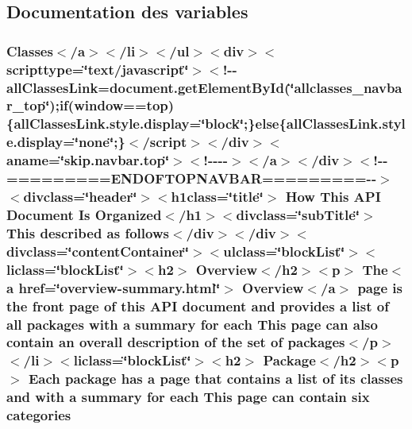 \subsection{Documentation des variables}
\hypertarget{help-doc_8html_a11477b189247b7b79e09770d044c6b82}{
\subsubsection[{categories}]{\setlength{\rightskip}{0pt plus 5cm}Classes$<$/{\bf a}$>$$<$/li$>$$<$/ul$>$$<$div$>$$<$scripttype=\char`\"{}text/javascript\char`\"{}$>$$<$!-\/-\/all\-Classes\-Link=document.\-get\-Element\-By\-Id(\char`\"{}allclasses\-\_\-navbar\-\_\-top\char`\"{});if(window==top)\{all\-Classes\-Link.\-style.\-display=\char`\"{}block\char`\"{};\}else\{all\-Classes\-Link.\-style.\-display=\char`\"{}none\char`\"{};\}$<$/script$>$$<$/div$>$$<$aname=\char`\"{}skip.\-navbar.\-top\char`\"{}$>$$<$!-\/-\/-\/-\/$>$$<$/a$>$$<$/div$>$$<$!-\/-\/=========E\-N\-D\-O\-F\-T\-O\-P\-N\-A\-V\-B\-A\-R=========-\/-\/$>$$<$divclass=\char`\"{}header\char`\"{}$>$$<$h1class=\char`\"{}title\char`\"{}$>$ How This {\bf A\-P\-I} Document Is Organized$<$/h1$>$$<$divclass=\char`\"{}sub\-Title\char`\"{}$>$ This described as follows$<$/div$>$$<$/div$>$$<$divclass=\char`\"{}content\-Container\char`\"{}$>$$<$ulclass=\char`\"{}block\-List\char`\"{}$>$$<$liclass=\char`\"{}block\-List\char`\"{}$>$$<$h2$>$ Overview$<$/h2$>$$<$p$>$ The$<${\bf a} href=\char`\"{}overview-\/summary.\-html\char`\"{}$>$ Overview$<$/{\bf a}$>$ page is the front page of this {\bf A\-P\-I} document and provides {\bf a} list of all packages with {\bf a} summary for each This page can also contain an overall {\bf description} of the set of packages$<$/p$>$$<$/li$>$$<$liclass=\char`\"{}block\-List\char`\"{}$>$$<$h2$>$ Package$<$/h2$>$$<$p$>$ Each package has {\bf a} page that contains {\bf a} list of its classes and with {\bf a} summary for each This page can contain six categories}}\label{help-doc_8html_a11477b189247b7b79e09770d044c6b82}
